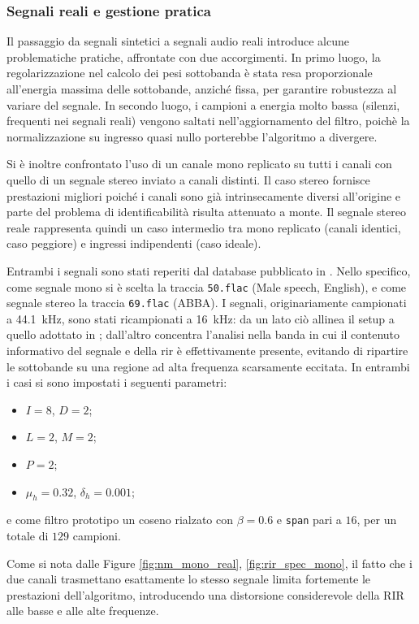 \documentclass[11pt,a4paper]{article}
\begin{document}
	\subsubsection{Segnali reali e gestione pratica}\label{ssec:real_signals}
	Il passaggio da segnali sintetici a segnali audio reali introduce alcune problematiche pratiche, affrontate con due accorgimenti.
	In primo luogo, la regolarizzazione nel calcolo dei pesi sottobanda è stata resa proporzionale all'energia massima delle sottobande, anziché fissa, per garantire robustezza al variare del segnale.
	In secondo luogo, i campioni a energia molto bassa (silenzi, frequenti nei segnali reali) vengono saltati nell'aggiornamento del filtro, poichè la normalizzazione su ingresso quasi nullo porterebbe l'algoritmo a divergere.
	
	Si è inoltre confrontato l'uso di un canale mono replicato su tutti i canali con quello di un segnale stereo inviato a canali distinti.
	Il caso stereo fornisce prestazioni migliori poiché i canali sono già intrinsecamente diversi all'origine e parte del problema di identificabilità risulta attenuato a monte.
	Il segnale stereo reale rappresenta quindi un caso intermedio tra mono replicato (canali identici, caso peggiore) e ingressi indipendenti (caso ideale).

	Entrambi i segnali sono stati reperiti dal database pubblicato in \cite{ebu_sqam_flac}. Nello specifico, come segnale mono si è scelta la traccia \texttt{50.flac} (Male speech, English), e come segnale stereo la traccia \texttt{69.flac} (ABBA). I segnali, originariamente campionati a \SI{44.1}{\kilo\hertz}, sono stati ricampionati a \SI{16}{\kilo\hertz}: da un lato ciò allinea il setup a quello adottato in \cite{11464373}; dall'altro concentra l'analisi nella banda in cui il contenuto informativo del segnale e della \ac{rir} è effettivamente presente, evitando di ripartire le sottobande su una regione ad alta frequenza scarsamente eccitata. In entrambi i casi si sono impostati i seguenti parametri:
	\begin{itemize}
		\item $I = 8$, $D = 2$;
		\item $L = 2$, $M = 2$;
		\item $P = 2$;
		\item $\mu_h = 0.32$, $\delta_h = 0.001$;
	\end{itemize}
	e come filtro prototipo un coseno rialzato con $\beta = 0.6$ e \texttt{span} pari a $16$, per un totale di $129$ campioni.

	Come si nota dalle Figure \ref{fig:nm_mono_real}, \ref{fig:rir_spec_mono}, il fatto che i due canali trasmettano esattamente lo stesso segnale limita fortemente le prestazioni dell'algoritmo, introducendo una distorsione considerevole della RIR alle basse e alle alte frequenze.
\end{document}
